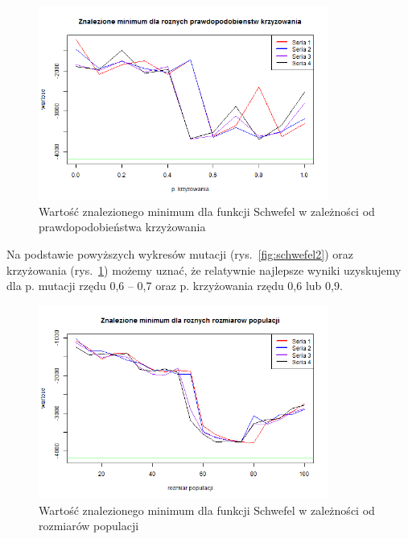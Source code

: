\documentclass[11pt, a4paper]{article}
\newcommand{\fbi}{\leavevmode{\parindent=1em\indent}}
\begin{document}
\begin{figure}[H]
	\begin{center}
		\includegraphics[width=0.85\textwidth]{./assets/Schwefel3.png}
		\caption{Wartość znalezionego minimum dla funkcji Schwefel w zależności od prawdopodobieństwa krzyżowania}
		\label{fig:schwefel3}
	\end{center}
\end{figure}

\fbi
Na podstawie powyższych wykresów mutacji (rys.~\ref{fig:schwefel2}) oraz krzyżowania (rys.~\ref{fig:schwefel3}) możemy uznać, że relatywnie najlepsze wyniki uzyskujemy dla p. mutacji rzędu 0,6 -- 0,7 oraz p. krzyżowania rzędu 0,6 lub 0,9.

\begin{figure}[H]
	\begin{center}
		\includegraphics[width=0.85\textwidth]{./assets/Schwefel4.png}
		\caption{Wartość znalezionego minimum dla funkcji Schwefel w zależności od rozmiarów populacji}
		\label{fig:schwefel4}
	\end{center}
\end{figure}
\end{document}
